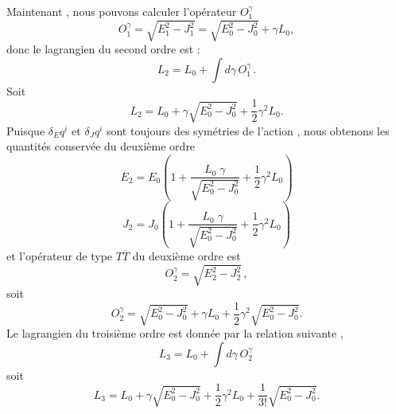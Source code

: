 \documentclass[12pt,a4paper, openany]{article}
\begin{document}
 \hspace{0.5cm}Maintenant , nous pouvons calculer l'opérateur $O_1^{\gamma}$
 \begin{equation}
 	 O_1^{\gamma}=\sqrt{E^{2}_1-J^{2}_1}=\sqrt{E^{2}_0-J^{2}_0}+{\gamma}L_0,
  \end{equation}
  donc le lagrangien du second ordre est :
  \begin{equation}
  L_2=L_0+\int  d{\gamma}\,O^{\gamma}_{1}\, . 	
  \end{equation}
  Soit 
  \begin{equation}
  L_2=L_0+\gamma{\sqrt{E^{2}_0-J^{2}_0}}+\frac{1}{2}{\gamma}^{2}L_0 .	
  \end{equation}
  Puisque  $ \delta_{E}q^{i}$ et $\delta_{J}q^i$ sont toujours des symétries de l'action , nous obtenons les quantités conservée du deuxième ordre 
  \begin{equation}
  E_2=E_0(1+\frac{L_0\;\gamma}{\sqrt{E^{2}_0-J^{2}_0}}+\frac{1}{2}{\gamma}^{2}L_0)	
  \end{equation}
  \begin{equation}
  J_2=J_0(1+\frac{L_0\;\gamma}{\sqrt{E^{2}_0-J^{2}_0}}+\frac{1}{2}{\gamma}^{2}L_0)	
  \end{equation}
  et l'opérateur de type $T{\overline{T}}$ du deuxième ordre est 
  \begin{equation}
  	O^{\gamma}_2=\sqrt{E^{2}_2-J^{2}_2} \,,
  \end{equation}
  soit 
  \begin{equation}
  O^{\gamma}_2=\sqrt{E^{2}_0-J^{2}_0}+{\gamma}L_0+\frac{1}{2}{\gamma}^{2}\sqrt{E^{2}_0-J^{2}_0} .
  \end{equation}
  Le lagrangien du troisième ordre est donnée par la relation suivante ,
  \begin{equation}
  	L_3=L_0+\int  d{\gamma}\,O^{\gamma}_{2}\,	
  \end{equation}
  soit 
  \begin{equation}
  	L_3=L_0+\gamma\sqrt{E^{2}_0-J^{2}_0}+\frac{1}{2}\gamma^2L_0+\frac{1}{3!}\sqrt{E^2_0-J_0^2} .
   \end{equation}
   
\end{document}
